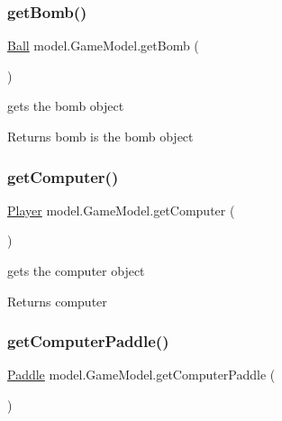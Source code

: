 \subsubsection{\texorpdfstring{get\+Bomb()}{getBomb()}}
{\footnotesize\ttfamily \hyperlink{classmodel_1_1_ball}{Ball} model.\+Game\+Model.\+get\+Bomb (\begin{DoxyParamCaption}{ }\end{DoxyParamCaption})}



gets the bomb object 

\begin{DoxyReturn}{Returns}
bomb is the bomb object 
\end{DoxyReturn}
\hypertarget{classmodel_1_1_game_model_a0bcf575adf7119282fe0a45e3f6bb5df}{}\label{classmodel_1_1_game_model_a0bcf575adf7119282fe0a45e3f6bb5df} 
\subsubsection{\texorpdfstring{get\+Computer()}{getComputer()}}
{\footnotesize\ttfamily \hyperlink{classmodel_1_1_player}{Player} model.\+Game\+Model.\+get\+Computer (\begin{DoxyParamCaption}{ }\end{DoxyParamCaption})}



gets the computer object 

\begin{DoxyReturn}{Returns}
computer 
\end{DoxyReturn}
\hypertarget{classmodel_1_1_game_model_a15542a275095daae439adcb8b5782055}{}\label{classmodel_1_1_game_model_a15542a275095daae439adcb8b5782055} 
\subsubsection{\texorpdfstring{get\+Computer\+Paddle()}{getComputerPaddle()}}
{\footnotesize\ttfamily \hyperlink{classmodel_1_1_paddle}{Paddle} model.\+Game\+Model.\+get\+Computer\+Paddle (\begin{DoxyParamCaption}{ }\end{DoxyParamCaption})}



